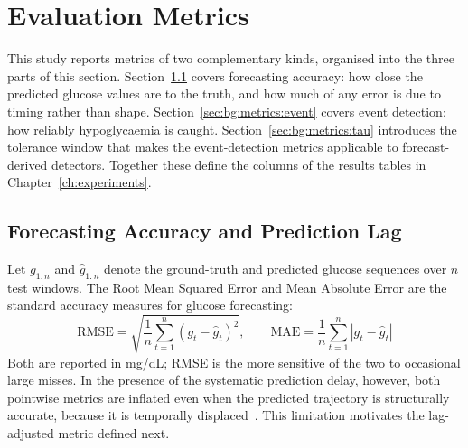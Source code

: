 \section{Evaluation Metrics} \label{sec:bg:metrics}

This study reports metrics of two complementary kinds, organised into the three parts of this section. Section~\ref{sec:bg:metrics:accuracy} covers forecasting accuracy: how close the predicted glucose values are to the truth, and how much of any error is due to timing rather than shape. Section~\ref{sec:bg:metrics:event} covers event detection: how reliably hypoglycaemia is caught. Section~\ref{sec:bg:metrics:tau} introduces the tolerance window that makes the event-detection metrics applicable to forecast-derived detectors. Together these define the columns of the results tables in Chapter~\ref{ch:experiments}.

\subsection{Forecasting Accuracy and Prediction Lag} \label{sec:bg:metrics:accuracy}

Let $g_{1:n}$ and $\hat{g}_{1:n}$ denote the ground-truth and predicted glucose sequences over $n$ test windows. The Root Mean Squared Error and Mean Absolute Error are the standard accuracy measures for glucose forecasting:
\begin{equation}
    \text{RMSE} = \sqrt{\frac{1}{n}\sum_{t=1}^{n}(g_t - \hat{g}_t)^2}, \qquad
    \text{MAE} = \frac{1}{n}\sum_{t=1}^{n}|g_t - \hat{g}_t|
    \label{eq:rmse_mae}
\end{equation}
Both are reported in mg/dL; RMSE is the more sensitive of the two to occasional large misses. In the presence of the systematic prediction delay, however, both pointwise metrics are inflated even when the predicted trajectory is structurally accurate, because it is temporally displaced~\citep{wolff2025cgpm}. This limitation motivates the lag-adjusted metric defined next.

